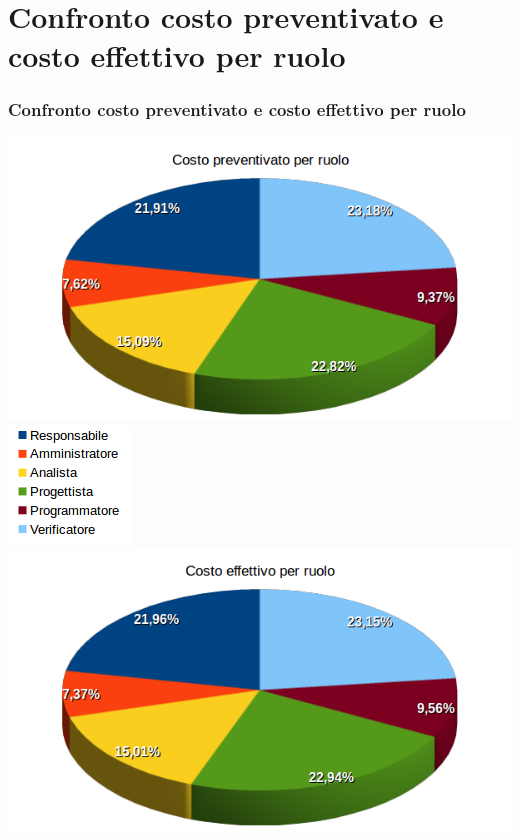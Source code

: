 \section{Confronto costo preventivato e costo effettivo per ruolo}
\begin{frame}
	\frametitle{Confronto costo preventivato e costo effettivo per ruolo}	
	\begin{center}
		\includegraphics[scale=0.27]{img/costoPREVENTIVATOperruolo.png}
		\qquad
		\includegraphics[scale=0.35]{img/legenda.png}
		\qquad
		\includegraphics[scale=0.27]{img/costoEFFETTIVOperruolo.png}	
	\end{center}
	
	
\end{frame}

